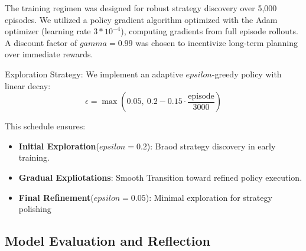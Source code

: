 \documentclass[twocolumn, a4paper]{article}
\begin{document}
The training regimen was designed for robust strategy discovery over 5,000 episodes. We utilized a policy gradient algorithm optimized with the Adam optimizer (learning rate $3*10^{-4}$), computing gradients from full episode rollouts. A discount factor of $gamma = 0.99$ was chosen to incentivize long-term planning over immediate rewards.

Exploration Strategy: We implement an adaptive $epsilon$-greedy policy with linear decay:
\[
\epsilon = \max\left(0.05,\ 0.2 - 0.15\cdot\frac{\text{episode}}{3000}\right)
\]

This schedule ensures:
\begin{itemize}
  \item \textbf{Initial Exploration}($epsilon = 0.2$): Braod strategy discovery in early training.
  \item \textbf{Gradual Expliotations}: Smooth Transition toward refined policy execution.
  \item \textbf{Final Refinement}($epsilon = 0.05$): Minimal exploration for strategy polishing
\end{itemize}

\subsection{Model Evaluation and Reflection}
\end{document}
